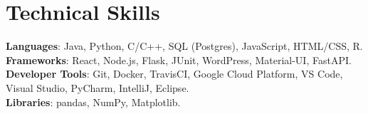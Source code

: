 \documentclass[letterpaper,11pt]{article}
\begin{document}
%
\section{Technical Skills}
 \begin{itemize}[leftmargin=0.15in, label={}]
    \small{\item{
     \textbf{Languages}{: Java, Python, C/C++, SQL (Postgres), JavaScript, HTML/CSS, R.} \\
     \textbf{Frameworks}{: React, Node.js, Flask, JUnit, WordPress, Material-UI, FastAPI.} \\
     \textbf{Developer Tools}{: Git, Docker, TravisCI, Google Cloud Platform, VS Code, Visual Studio, PyCharm, IntelliJ, Eclipse.} \\
     \textbf{Libraries}{: pandas, NumPy, Matplotlib.}
    }}
 \end{itemize}


\end{document}
